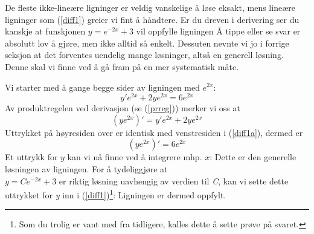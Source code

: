 De fleste ikke-lineære ligninger er veldig vanskelige å løse eksakt, mens lineære ligninger som (\ref{diff1}) greier vi fint å håndtere. Er du dreven i derivering ser du kanskje at funskjonen ${y= e^{-2x}+3} $ vil oppfylle ligningen \vs
{}
Å tippe eller se svar er absolutt lov å gjøre, men ikke alltid så enkelt. Dessuten nevnte vi jo i forrige seksjon at det forventes uendelig mange løsninger, altså en generell løsning. Denne skal vi finne ved å gå fram på en mer systematisk måte.\vsk

Vi starter med å gange begge sider av ligningen med $ e^{2x} $:
\begin{equation}
y'e^{2x}+2ye^{2x}=6e^{2x} \label{diff1a}
\end{equation}
Av produktregelen ved derivasjon (se (\ref{prreg})) merker vi oss at
\[ \left(ye^{2x}\right)'=y'e^{2x}+2ye^{2x} \]
Uttrykket på høyresiden over er identisk med venstresiden i (\ref{diff1a}), dermed er
\[ \left(ye^{2x}\right)'= 6e^{2x}\]
Et uttrykk for $ y $ kan vi nå finne ved å integrere mhp. $ x $:
Dette er den generelle løsningen av ligningen. For å tydeliggjøre at\\ $ y= {Ce^{-2x} +3} $ er riktig løsning uavhengig av verdien til \textit{C}, kan vi sette dette uttrykket for \textit{y} inn i (\ref{diff1})\footnote{Som du trolig er vant med fra tidligere, kalles dette å sette prøve på svaret.}:
Ligningen er dermed oppfylt.\regv
\newpage
{}
